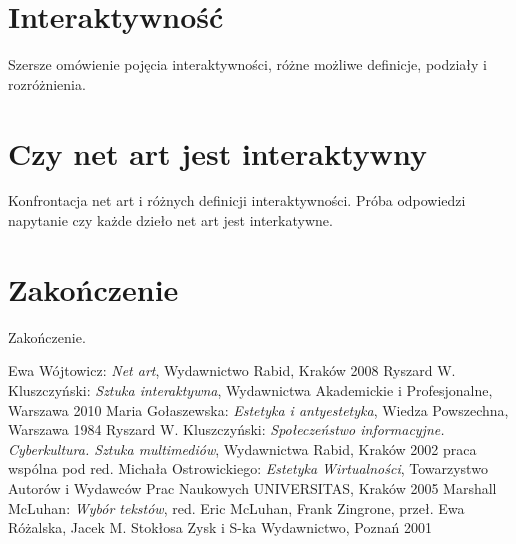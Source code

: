 \documentclass[a4paper,12pt]{article}
\begin{document}
\section{Interaktywność}
Szersze omówienie pojęcia interaktywności, różne możliwe
definicje, podziały i rozróżnienia.

\section{Czy net art jest interaktywny}
Konfrontacja net art i różnych definicji interaktywności.
Próba odpowiedzi napytanie czy każde dzieło net art jest
interkatywne.

\section{Zakończenie}
Zakończenie.

\begin{thebibliography}{6}
  Ewa Wójtowicz:
  \textit{Net art},
  Wydawnictwo Rabid, Kraków 2008
  Ryszard W. Kluszczyński:
  \textit{Sztuka interaktywna},
  Wydawnictwa Akademickie i Profesjonalne,
  Warszawa 2010
  Maria Gołaszewska:
  \textit{Estetyka i antyestetyka},
  Wiedza Powszechna, Warszawa 1984
  Ryszard W. Kluszczyński:
  \textit{Społeczeństwo informacyjne. Cyberkultura. Sztuka multimediów},
  Wydawnictwa Rabid, Kraków 2002
  praca wspólna pod red. Michała Ostrowickiego:
  \textit{Estetyka Wirtualności},
  Towarzystwo Autorów i Wydawców Prac Naukowych UNIVERSITAS,
  Kraków 2005
  Marshall McLuhan:
  \textit{Wybór tekstów},
  red. Eric McLuhan, Frank Zingrone,
  przeł. Ewa Różalska, Jacek M. Stokłosa
  Zysk i S-ka Wydawnictwo, Poznań 2001


\end{thebibliography}
\end{document}

